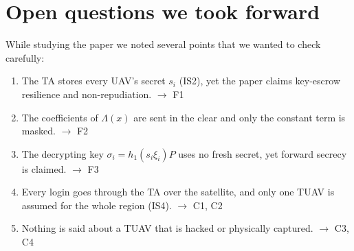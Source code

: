 \section{Open questions we took forward}
While studying the paper we noted several points that we wanted to check carefully:
\begin{enumerate}[leftmargin=*]
\item The TA stores every UAV's secret $s_i$ (IS2), yet the paper claims key-escrow resilience and non-repudiation. \hfill $\rightarrow$ F1
\item The coefficients of $\Lambda(x)$ are sent in the clear and only the constant term is masked. \hfill $\rightarrow$ F2
\item The decrypting key $\sigma_i=h_1(s_i\xi_i)P$ uses no fresh secret, yet forward secrecy is claimed. \hfill $\rightarrow$ F3
\item Every login goes through the TA over the satellite, and only one TUAV is assumed for the whole region (IS4). \hfill $\rightarrow$ C1, C2
\item Nothing is said about a TUAV that is hacked or physically captured. \hfill $\rightarrow$ C3, C4
\end{enumerate}

